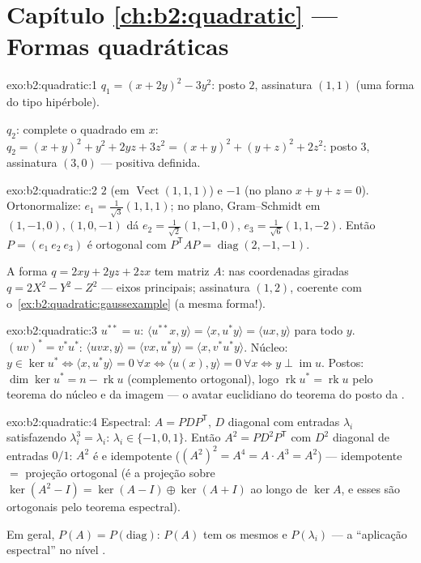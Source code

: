 \section*{Capítulo \ref{ch:b2:quadratic} --- Formas quadráticas}

\begin{solution}{exo:b2:quadratic:1}
$q_1 = (x + 2y)^2 - 3y^2$: posto $2$, assinatura $(1, 1)$ (uma
forma do tipo hipérbole).

$q_2$: complete o quadrado em $x$: $q_2 = (x + y)^2 + y^2 + 2yz +
3z^2 = (x+y)^2 + (y + z)^2 + 2z^2$: posto $3$, assinatura $(3, 0)$
--- positiva definida.
\end{solution}

\begin{solution}{exo:b2:quadratic:2}
 $2$ (em $\operatorname{Vect}(1,1,1)$) e $-1$ (no
plano $x + y + z = 0$). Ortonormalize: $e_1 =
\frac{1}{\sqrt3}(1,1,1)$; no plano, Gram--Schmidt em $(1,-1,0),
(1,0,-1)$ dá $e_2 = \frac{1}{\sqrt2}(1,-1,0)$, $e_3 =
\frac{1}{\sqrt6}(1,1,-2)$. Então $P = (e_1\ e_2\ e_3)$ é ortogonal
com $P^{\mathsf T}AP = \operatorname{diag}(2,-1,-1)$.

A forma $q = 2xy + 2yz + 2zx$ tem matriz $A$: nas coordenadas
giradas $q = 2X^2 - Y^2 - Z^2$ --- eixos principais; assinatura
$(1,2)$, coerente com o~\cref{ex:b2:quadratic:gaussexample}
(a mesma forma!).
\end{solution}

\begin{solution}{exo:b2:quadratic:3}
$u^{**} = u$: $\langle u^{**}x, y\rangle = \langle x, u^*y\rangle =
\langle ux, y\rangle$ para todo $y$. $(uv)^* = v^*u^*$: $\langle
uvx, y\rangle = \langle vx, u^*y\rangle = \langle x,
v^*u^*y\rangle$. Núcleo: $y \in \ker u^* \iff \langle x, u^*y
\rangle = 0\ \forall x \iff \langle u(x), y\rangle = 0\ \forall x
\iff y \perp \operatorname{im} u$. Postos: $\dim\ker u^* = n -
\operatorname{rk} u$ (complemento ortogonal), logo
$\operatorname{rk} u^* = \operatorname{rk} u$ pelo teorema do núcleo e da imagem ---
o avatar euclidiano do teorema do posto da .
\end{solution}

\begin{solution}{exo:b2:quadratic:4}
Espectral: $A = PDP^{\mathsf T}$, $D$ diagonal com entradas
$\lambda_i$ satisfazendo $\lambda_i^3 = \lambda_i$: $\lambda_i \in
\{-1, 0, 1\}$. Então $A^2 = PD^2P^{\mathsf T}$ com $D^2$ diagonal
de entradas $0/1$: $A^2$ é  e idempotente
($(A^2)^2 = A^4 = A\cdot A^3 = A^2$) ---  idempotente
$=$ projeção ortogonal (é a projeção sobre
$\ker(A^2 - I) = \ker(A-I)\oplus\ker(A+I)$ ao longo de $\ker A$, e
esses são ortogonais pelo teorema espectral).

Em geral, $P(A) = P\!\left(\text{diag}\right)$: $P(A)$ tem os
mesmos  e  $P(\lambda_i)$ --- a ``aplicação
espectral'' no nível .
\end{solution}

